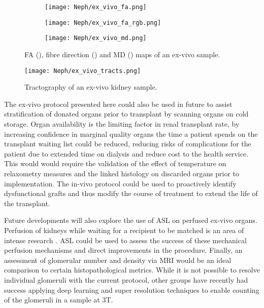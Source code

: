 \begin{figure}[H]
	\centering
	\begin{subfigure}[c]{0.31\textwidth}
		\centering
		\texttt{[image: Neph/ex\_vivo\_fa.png]} %
		\caption{}
		\label{fig:ex_ex_dti_fa}
	\end{subfigure}
	\hfill
	\begin{subfigure}[c]{0.31\textwidth}
		\centering
		\texttt{[image: Neph/ex\_vivo\_fa\_rgb.png]} %
		\caption{}
		\label{fig:ex_ex_dti_fa_rgb}
	\end{subfigure}
	\hfill	
	\begin{subfigure}[c]{0.31\textwidth}
		\centering
		\texttt{[image: Neph/ex\_vivo\_md.png]} %
		\caption{}
		\label{fig:ex_ex_dti_md}
	\end{subfigure}
	\caption{\ac{FA} (), fibre direction () and \ac{MD} () maps of an ex-vivo sample.}
	\label{fig:ex_ex_dti_maps}
\end{figure}

\begin{figure}[H]
	\centering
	\texttt{[image: Neph/ex\_vivo\_tracts.png]} %
	\caption{Tractography of an ex-vivo kidney sample.}
	\label{fig:ex_ex_tracts}	
\end{figure}

The ex-vivo protocol presented here could also be used in future to assist stratification of donated organs prior to transplant by scanning organs on cold storage. Organ availability is the limiting factor in renal transplant rate, by increasing confidence in marginal quality organs the time a patient spends on the transplant waiting list could be reduced, reducing risks of complications for the patient due to extended time on dialysis and reduce cost to the health service. This would would require the validation of the effect of temperature on relaxometry measures and the linked histology on discarded organs prior to implementation. The in-vivo protocol could be used to proactively identify dysfunctional grafts and thus modify the course of treatment to extend the life of the transplant.

Future developments will also explore the use of \ac{ASL} on perfused ex-vivo organs. Perfusion of kidneys while waiting for a recipient to be matched is an area of intense research \cite{bellini_cold_2019,moers_value_2010,wight_pulsatile_2003}. \ac{ASL} could be used to assess the success of these mechanical perfusion mechanisms and direct improvements in the procedure. Finally, an assessment of glomerular number and density via \ac{MRI} would be an ideal comparison to certain histopathological metrics. While it is not possible to resolve individual glomeruli with the current protocol, other groups have recently had success applying deep learning and super resolution techniques to enable counting of the glomeruli in a sample at 3T.



